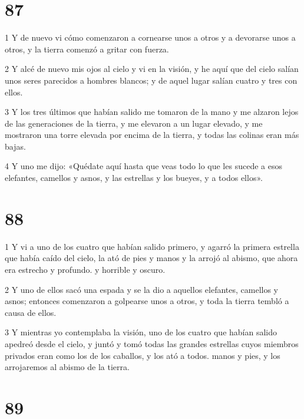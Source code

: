 \chapter{87}

\par 1 Y de nuevo vi cómo comenzaron a cornearse unos a otros y a devorarse unos a otros, y la tierra comenzó a gritar con fuerza.
\par 2 Y alcé de nuevo mis ojos al cielo y vi en la visión, y he aquí que del cielo salían unos seres parecidos a hombres blancos; y de aquel lugar salían cuatro y tres con ellos.
\par 3 Y los tres últimos que habían salido me tomaron de la mano y me alzaron lejos de las generaciones de la tierra, y me elevaron a un lugar elevado, y me mostraron una torre elevada por encima de la tierra, y todas las colinas eran más bajas.
\par 4 Y uno me dijo: «Quédate aquí hasta que veas todo lo que les sucede a esos elefantes, camellos y asnos, y las estrellas y los bueyes, y a todos ellos».

\chapter{88}

\par 1 Y vi a uno de los cuatro que habían salido primero, y agarró la primera estrella que había caído del cielo, la ató de pies y manos y la arrojó al abismo, que ahora era estrecho y profundo. y horrible y oscuro.
\par 2 Y uno de ellos sacó una espada y se la dio a aquellos elefantes, camellos y asnos; entonces comenzaron a golpearse unos a otros, y toda la tierra tembló a causa de ellos.
\par 3 Y mientras yo contemplaba la visión, uno de los cuatro que habían salido apedreó desde el cielo, y juntó y tomó todas las grandes estrellas cuyos miembros privados eran como los de los caballos, y los ató a todos. manos y pies, y los arrojaremos al abismo de la tierra.

\chapter{89}

